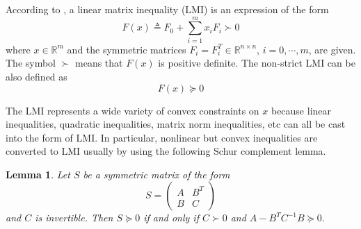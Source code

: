 \documentclass[trsc,nonblindrev]{informs3} %
\newtheorem{lmm}{Lemma}
\begin{document}
%
\begin{APPENDIX}{}

According to \citep{boyd_linear_1994}, a linear matrix inequality (LMI) is an expression of the form
$$F(x)\triangleq F_0+\sum_{i=1}^m x_iF_i \succ 0$$
where $x\in\mathbb{R}^m$ and the symmetric matrices $F_i=F_i^T\in\mathbb{R}^{n\times n}$, $i=0,\cdots,m$, are given. The symbol $\succ$ means that $F(x)$  is positive definite.
The non-strict LMI can be also defined as
$$F(x)\succeq 0$$

The LMI represents a wide variety of convex constraints on $x$ because linear inequalities, quadratic inequalities, matrix norm inequalities, etc can all be cast into the form of LMI.
In particular, nonlinear but convex inequalities are converted to LMI usually by using the following Schur complement lemma.

\begin{lmm}
Let $S$ be a symmetric matrix of the form
$$S=\begin{pmatrix}
     A&B^T\\B&C
    \end{pmatrix}
$$
and $C$ is invertible. Then $S\succeq 0$ if and only if $C\succ 0$
and $A-B^TC^{-1}B\succeq 0$.
\end{lmm}

\end{APPENDIX}
%
%




\end{document}
